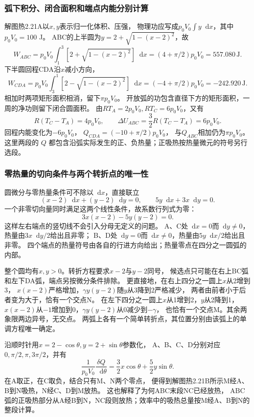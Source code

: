 \documentclass[UTF8,fontset=fandol,a4paper,11pt]{ctexart}
\newcommand{\dd}{\mathop{}\!\mathrm{d}}
\begin{document}
\subsubsection*{弧下积分、闭合面积和端点内能分别计算}
解图热2.21A以$x,y$表示归一化体积、压强，
物理功应写成$p_0V_0\int y\dd x$，其中$p_0V_0=100$ J。
ABC的上半圆为$y=2+\sqrt{1-(x-2)^2}$，故
\[
W_{ABC}=p_0V_0\int_1^3[2+\sqrt{1-(x-2)^2}]\dd x
=(4+\pi/2)p_0V_0=557.080\,\mathrm J.
\]
下半圆回程CDA沿$x$减小方向，
\[
W_{CDA}=p_0V_0\int_3^1[2-\sqrt{1-(x-2)^2}]\dd x
=(-4+\pi/2)p_0V_0=-242.920\,\mathrm J.
\]
相加时两项矩形面积相消，留下$\pi p_0V_0$。
开放弧的功包含直径下方的矩形面积，一周的净功则留下闭合圆面积。
由$RT_A=2p_0V_0,RT_C=6p_0V_0$，又有
\[
R(T_C-T_A)=4p_0V_0,\qquad
\Delta U_{ABC}=\frac32R(T_C-T_A)=6p_0V_0.
\]
回程内能变化为$-6p_0V_0$，
$Q_{CDA}=(-10+\pi/2)p_0V_0$，
与$Q_{ABC}$相加仍为$\pi p_0V_0$。
这里两段的 $Q$ 都包含沿弧实际发生的正、负热量；正吸热按热量微元的符号另行选段。

\subsubsection*{零热量的切向条件与两个转折点的唯一性}
圆微分与零热量条件可不除以$\dd x$，直接联立
\[
(x-2)\dd x+(y-2)\dd y=0,\qquad
5y\dd x+3x\dd y=0.
\]
一个非零切向量同时满足这两个线性条件，故系数行列式为零：
\[
3x(x-2)-5y(y-2)=0.
\]
这样左右端点的竖切线不会引入分母无定义的问题。
A、C处$\dd x=0$而$\dd y\ne0$，热量由$3x\dd y/2$给出且非零；
B、D处$\dd y=0$而$\dd x\ne0$，热量由$5y\dd x/2$给出且非零。
四个端点的热量符号由各自的行进方向给出；热量零点在四分之一圆弧的内部。

整个圆均有$x,y>0$。转折方程要求$x-2$与$y-2$同号，
候选点只可能在右上BC弧和左下DA弧，端点另按微分条件排除。
更直接地，在右上四分之一圆上$x$从2增到3，
$x(x-2)$严格增加，$\gamma y(y-2)$随$y$从3降到2严格减少，
两者由前者小于后者变为大于，恰有一个交点N。
在左下四分之一圆上$x$从1增到2，$y$从2降到1，
$x(x-2)$从$-1$增加到0，$\gamma y(y-2)$从0减少到$-\gamma$，
也恰有一个交点M。其余两象限两边异号，无交点。
两弧上各有一个简单转折点，其位置分别由该弧上的单调方程唯一确定。

沿顺时针用$x=2-\cos\theta,y=2+\sin\theta$参数化，
A、B、C、D分别对应$0,\pi/2,\pi,3\pi/2$，并有
\[
\frac{1}{p_0V_0}\frac{\delta Q}{\dd\theta}
=\frac32x\cos\theta+\frac52y\sin\theta.
\]
在A取正，在C取负，结合只有M、N两个零点，
便得到解图热2.21B所示M经A、B到N吸热，N经C、D到M放热。
这也解释了为何ABC末段NC已经放热，
ABC弧的正吸热部分从A经B到N，NC段则放热；效率中的吸热总量按M经A、B到N的整段计算。
\end{document}
